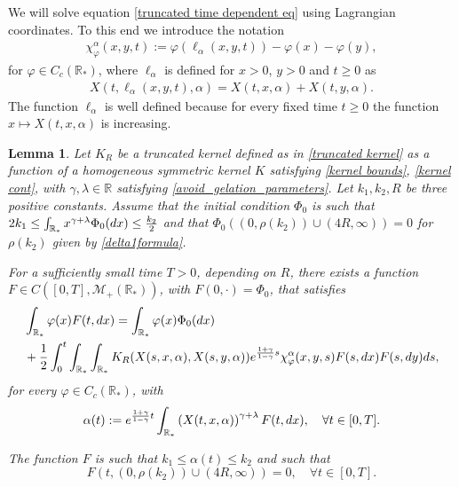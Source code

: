 \documentclass[11pt]{article}
\numberwithin{equation}{section}
\theoremstyle{plain}
\newtheorem{lemma}[theorem]{Lemma}
\newcommand{\der}{\textup{d}}
\begin{document}
We will solve equation \eqref{truncated time dependent eq} using Lagrangian coordinates. To this end we introduce the notation 
\begin{align*}
\chi^\alpha_{\varphi}(x,y,t):=\varphi(\ell_{\alpha}(x,y,t))- \varphi(x) - \varphi(y), 
\end{align*}
for $\varphi \in C_c(\mathbb R_*)$, where $\ell_\alpha$ is defined for $x >0$, $y>0$ and $t \geq 0$ as 
\begin{align}\label{define l phi}
X(t, \ell_\alpha(x,y,t), \alpha)=X(t,x, \alpha) + X(t,y, \alpha).
\end{align}
The function $\ell_\alpha $ is well defined because for every fixed time $t\geq 0$ the function $x \mapsto X(t,x, \alpha )$ is increasing. 

\begin{lemma}\label{lem:auxiliary time dep truncated} 
Let $K_R$ be a truncated kernel defined as in \eqref{truncated kernel} as a function of a homogeneous symmetric kernel $K$ satisfying \eqref{kernel bounds},  \eqref{kernel cont},  with $\gamma , \lambda \in \mathbb R$ satisfying \eqref{avoid_gelation_parameters}. 
Let $k_1, k_2, R$ be three positive constants. 
Assume that the initial condition $\Phi_0$ is such that $ 2k_1 \leq \int_{\mathbb R_*} x^{\gamma+\lambda} \Phi_0(\der x ) \leq \frac{k_2}{2}$ and that $\Phi_0((0,\rho(k_2)) \cup (4R, \infty ))=0$ for $\rho(k_2)$ given by \eqref{delta1formula}. 

For a sufficiently small time  $T>0$, depending on $R$, 
there exists a function $F \in C([0, T] , \mathcal M_{+}(\mathbb R_*))$, with  $F (0, \cdot)=\Phi_0$, that satisfies  
\begin{align} \label{eq for F}
&\int_{\mathbb R_*} \varphi(x) F(t,  \der x) =  \int_{\mathbb R_*} \varphi(x) \Phi_0( \der x)  \\
&+ \frac{1}{2} \int_0^t \int_{\mathbb R_*} \int_{\mathbb R_*} K_R(X(s,x, \alpha),X(s,y,\alpha))e^{\frac{1+\gamma}{1-\gamma}s}\chi^\alpha_{\varphi}(x,y,s)F(s,  \der x) F(s,  \der y) \der s, \nonumber
\end{align}
 for every $\varphi \in C_c(\mathbb R_*)$, with
 \begin{equation}\label{alfa}
\alpha(t):=e^{\frac{1+\gamma}{1-\gamma} t}\int_{\mathbb R_*} \left(X(t,x, \alpha)\right)^{\gamma+\lambda} F(t, \der x ), \quad \forall t \in [0,T].
 \end{equation} 

The function $F$ is such that $ k_1 \leq \alpha (t) \leq k_2$ and such that
\begin{equation} \label{support FPhi}
F(t,(0,\rho(k_2) )\cup (4R, \infty ))=0, \quad  \forall t \in[0,T].
\end{equation} 
\end{lemma}
\end{document}
